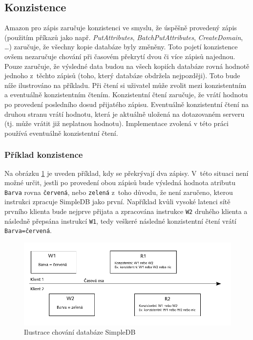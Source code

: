 \documentclass[oneside,12pt]{fithesis2}
\begin{document}
\subsection{Konzistence}
Amazon pro zápis zaručuje konzistenci ve smyslu, že úspěšně provedený zápis (použitím příkazů jako např. \emph{PutAttributes}, \emph{BatchPutAttributes}, \emph{CreateDomain}, \dots) zaručuje, že všechny kopie databáze byly změněny. Toto pojetí konzistence ovšem nezaručuje chování při časovém překrytí dvou či více zápisů najednou. Pouze zaručuje, že výsledné data budou na všech kopiích databáze rovná hodnotě jednoho z~těchto zápisů (toho, který databáze obdržela nejpozději). Toto bude níže ilustrováno na příkladu.
Při čtení si uživatel může zvolit mezi konzistentním a eventuálně konzistentním čtením. Konzistentní čtení zaručuje, že vrátí hodnotu po provedení posledního dosud přijatého zápisu. Eventuálně konzistentní čtení na druhou stranu vrátí hodnotu, která je aktuálně uložená na dotazovaném serveru (tj. může vrátit již neplatnou hodnotu). Implementace zvolená v této práci používá eventuálně konzistentní čtení.
\subsubsection*{Příklad konzistence}
Na obrázku \ref{consistencyExample} je uveden příklad, kdy se překrývají dva zápisy. V~této situaci není možné určit, jestli po provedení obou zápisů bude výsledná hodnota atributu \verb<Barva< rovna \verb<červená<, nebo \verb<zelená< z~toho důvodu, že není zaručeno, kterou instrukci zpracuje SimpleDB jako první. Například kvůli vysoké latenci sítě prvního klienta bude nejprve přijata a zpracována instrukce \verb<W2< druhého klienta a následně přepsána instrukcí \verb<W1<, tedy veškeré následné konzistentní čtení vrátí \verb<Barva=červená<.
\begin{figure}[h]
 \centering
 \includegraphics[scale=0.9]{ConsistencyExample}
 \caption{Ilustrace chování databáze SimpleDB}
 \label{consistencyExample}
\end{figure}
\end{document}
